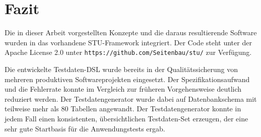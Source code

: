 \section{Fazit}

Die in dieser Arbeit vorgestellten Konzepte und die daraus resultierende Software wurden in das vorhandene STU-Framework integriert.
%
Der  Code steht  unter der Apache License 2.0 unter \texttt{https://github.com/Seitenbau/stu/}  zur Verfügung. 
%

Die entwickelte Testdaten-DSL wurde bereits in der Qualitätssicherung von mehreren produktiven Softwareprojekten  eingesetzt.
%
Der Spezifikationsaufwand und die Fehlerrate konnte  im Vergleich zur  früheren Vorgehensweise  deutlich reduziert werden.
%
Der Testdatengenerator wurde dabei  auf  Datenbankschema mit teilweise mehr als 80 Tabellen angewandt.
%
Der  Testdatengenerator konnte in jedem Fall  einen konsistenten, übersichtlichen Testdaten-Set erzeugen, der eine sehr gute Startbasis für die Anwendungstests ergab.

%
